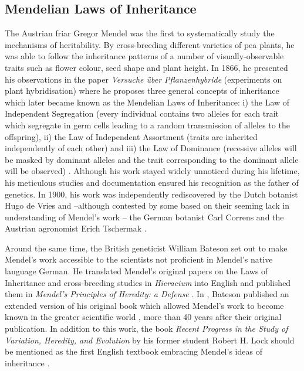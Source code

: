 \subsection{Mendelian Laws of Inheritance}
The Austrian friar Gregor Mendel was the first to systematically study the mechanisms of heritability. By cross-breeding different varieties of pea plants, he was able to follow the inheritance patterns of a number of visually-observable traits such as flower colour, seed shape and plant height. In 1866, he presented his observations in the paper \textit{Versuche über Pflanzenhybride} (experiments on plant hybridisation) where he proposes three general concepts of inheritance which later became known as the Mendelian Laws of Inheritance: i) the Law of Independent Segregation (every individual contains two alleles for each trait which segregate in germ cells leading to a random transmission of alleles to the offspring), ii) the Law of Independent Assortment (traits are inherited independently of each other) and iii) the Law of Dominance (recessive alleles will be masked by dominant alleles and the trait corresponding to the dominant allele will be observed) \citep{Mendel1866}. Although his work stayed widely unnoticed during his lifetime, his meticulous studies and documentation ensured his recognition as the father of genetics. In 1900, his work was independently rediscovered by the Dutch botanist Hugo de Vries \citep[translation into English]{deVries1900,Hannah1950} and --although contested by some based on their seeming lack in understanding of Mendel's work \citep{Keynes2008,Monaghan1986,Monaghan1987}-- the German botanist Carl Correns \citep[translation into English]{Correns1900,Piernick1950} and the Austrian agronomist Erich Tschermak \parencite*{Tschermak1900}. 

Around the same time, the British geneticist William Bateson set out to make Mendel's work accessible to the scientists not proficient in Mendel's native language German. He translated Mendel's original papers on the Laws of Inheritance \citep{Mendel1866} and cross-breeding studies in \textit{Hieracium} \citep{Mendel1869} into English and published them in \textit{Mendel's Principles of Heredity: a Defense} \citep{Bateson1902}. In \parencite*{Bateson1909}, Bateson published an extended version of his original book which allowed Mendel's work to become known in the greater scientific world \citep{Keynes2008}, more than 40 years after their original publication. In addition to this work, the book \textit{Recent Progress in the Study of Variation, Heredity, and Evolution} by his former student Robert H. Lock should be mentioned as the first English textbook embracing Mendel's ideas of inheritance \citep{Lock1906,Edwards2013}.


